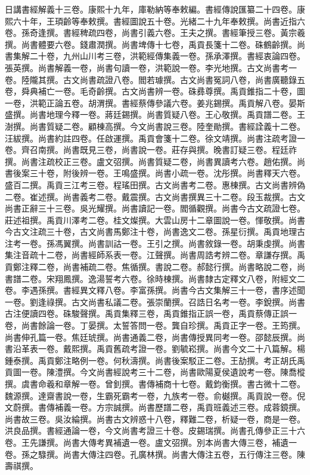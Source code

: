 \begin{pinyinscope}
日講書經解義十三卷。康熙十九年，庫勒納等奉敕編。書經傳說匯纂二十四卷。康熙六十年，王頊齡等奉敕撰。書經圖說五十卷。光緒二十九年奉敕撰。尚書近指六卷。孫奇逢撰。書經稗疏四卷，尚書引義六卷。王夫之撰。書經筆授三卷。黃宗羲撰。尚書體要六卷。錢肅潤撰。尚書埤傳十七卷，禹貢長箋十二卷。硃鶴齡撰。尚書集解二十卷，九州山川考三卷，洪範經傳集義一卷。孫承澤撰。書經衷論四卷。張英撰。尚書解義一卷，尚書句讀一卷，洪範說一卷。李光地撰。古文尚書考一卷。陸隴其撰。古文尚書疏證八卷。閻若璩撰。古文尚書冤詞八卷，尚書廣聽錄五卷，舜典補亡一卷。毛奇齡撰。古文尚書辨一卷。硃彞尊撰。禹貢錐指二十卷，圖一卷，洪範正論五卷。胡渭撰。書經蔡傳參議六卷。姜兆錫撰。禹貢解八卷。晏斯盛撰。尚書地理今釋一卷。蔣廷錫撰。尚書質疑八卷。王心敬撰。禹貢譜二卷。王澍撰。尚書質疑二卷。顧棟高撰。今文尚書說三卷。陸奎勛撰。書經詮義十二卷。汪紱撰。尚書約註四卷。任啟運撰。禹貢會箋十二卷。徐文靖撰。尚書注疏考證一卷。齊召南撰。尚書既見三卷，尚書說一卷。莊存與撰。晚書訂疑三卷。程廷祚撰。尚書注疏校正三卷。盧文弨撰。尚書質疑二卷，尚書異讀考六卷。趙佑撰。尚書後案三十卷，附後辨一卷。王鳴盛撰。尚書小疏一卷。沈彤撰。尚書釋天六卷。盛百二撰。禹貢三江考三卷。程瑤田撰。古文尚書考二卷。惠棟撰。古文尚書辨偽二卷。崔述撰。尚書義考二卷。戴震撰。古文尚書撰異三十二卷。段玉裁撰。古文尚書正辭三十三卷。吳光耀撰。尚書讀記一卷。閻循觀撰。尚書今古文疏證七卷。莊述祖撰。禹貢川澤考二卷。桂文燦撰。大雲山房十二章圖說一卷。惲敬撰。尚書今古文注疏三十卷，古文尚書馬鄭注十卷，尚書逸文二卷。孫星衍撰。禹貢地理古注考一卷。孫馮翼撰。尚書訓詁一卷。王引之撰。尚書敘錄一卷。胡秉虔撰。尚書集注音疏十二卷，尚書經師系表一卷。江聲撰。尚書周誥考辨二卷。章謙存撰。禹貢鄭注釋二卷，尚書補疏二卷。焦循撰。書說二卷。郝懿行撰。尚書略說二卷，尚書譜二卷。宋翔鳳撰。逸湯誓考六卷。徐時棟撰。尚書隸古定釋文八卷，附經文二卷。李遇孫撰。書經異文釋八卷。李富孫撰。尚書今古文集解三十一卷，書序述聞一卷。劉逢祿撰。古文尚書私議二卷。張崇蘭撰。召誥日名考一卷。李銳撰。尚書古注便讀四卷。硃駿聲撰。禹貢集釋三卷，禹貢錐指正誤一卷，禹貢蔡傳正誤一卷，尚書餘論一卷。丁晏撰。太誓答問一卷。龔自珍撰。禹貢正字一卷。王筠撰。尚書伸孔篇一卷。焦廷琥撰。尚書通義二卷，尚書傳授異同考一卷。邵懿辰撰。尚書沿革表一卷。戴熙撰。禹貢舊疏考證一卷。劉毓崧撰。尚書今文二十八篇解。楊鍾泰撰。禹貢鄭注略例一卷。何秋濤撰。尚書後案駁正二卷。王劼撰。考正胡氏禹貢圖一卷。陳澧撰。今文尚書經說考三十二卷，尚書歐陽夏侯遺說考一卷。陳喬樅撰。虞書命羲和章解一卷。曾釗撰。書傳補商十七卷。戴鈞衡撰。書古微十二卷。魏源撰。達齋書說一卷，生霸死霸考一卷，九族考一卷。俞樾撰。禹貢說一卷。倪文蔚撰。書傳補義一卷。方宗誠撰。尚書歷譜二卷，禹貢班義述三卷。成蓉鏡撰。尚書故三卷。吳汝綸撰。尚書古文辨惑十八卷，釋難二卷，析疑一卷，商是一卷。洪良品撰。書經通論一卷，今文尚書考證三十卷。皮錫瑞撰。尚書孔傳參正三十六卷。王先謙撰。尚書大傳考異補遺一卷。盧文弨撰。別本尚書大傳三卷，補遺一卷。孫之騄撰。尚書大傳注四卷。孔廣林撰。尚書大傳注五卷，五行傳注三卷。陳壽祺撰。


\end{pinyinscope}
